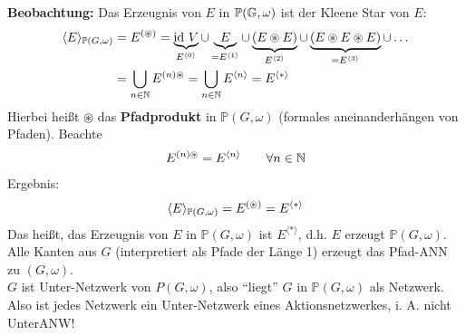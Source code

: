 \textbf{Beobachtung:} Das Erzeugnis von $E$ in $\mathbb{P}(\G,\omega)$ ist der Kleene Star von $E$:
\begin{align*}
\langle E\rangle_{\mathbb{P}(G,\omega)}
&=E^{(\circledast)}
=\underbrace{\id~V}_{E^{\langle0\rangle}}\cup \underbrace{E}_{=E^{\langle1\rangle}}\cup \underbrace{(E\circledast E)}_{E^{\langle2\rangle}}\cup\underbrace{(E\circledast E\circledast E)}_{=E^{\langle3\rangle}}\cup\ldots\\
&=\bigcup\limits_{n\in\N} E^{(n)\circledast}
=\bigcup\limits_{n\in\N} E^{\langle n\rangle}
=E^{\langle\ast\rangle}
\end{align*}
Hierbei heißt $\circledast$ das \textbf{Pfadprodukt} in $\mathbb{P}(G,\omega)$ (formales aneinanderhängen von Pfaden). Beachte
\begin{align*}
E^{(n)\circledast}=E^{\langle n\rangle}\qquad\forall n\in\N
\end{align*}
Ergebnis:
\begin{align*}
\langle E\rangle_{\P(G,\omega)}=E^{(\circledast)}=E^{\langle\ast\rangle}
\end{align*}
Das heißt, das Erzeugnis von $E$ in $\mathbb{P}(G,\omega)$ ist $E^{\langle\ast\rangle}$, d.h. $E$ erzeugt $\mathbb{P}(G,\omega)$.\\
Alle Kanten aus $G$ (interpretiert als Pfade der Länge 1) erzeugt das Pfad-ANN zu $(G,\omega)$.\\
$G$ ist Unter-Netzwerk von $P(G,\omega)$, also ``liegt'' $G$ in $\mathbb{P}(G,\omega)$ als Netzwerk.\\
Also ist jedes Netzwerk ein Unter-Netzwerk eines Aktionsnetzwerkes, i. A. nicht UnterANW!





